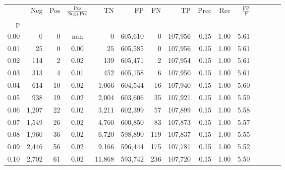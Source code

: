 \begin{tabular}{rrrcrrrrrrrrrrr}
\toprule
{} &     Neg &    Pos & $\frac{\text{Pos}}{\text{Neg}+\text{Pos}}$ &       TN &       FP &       FN &       TP &  Prec &   Rec & $\frac{\text{FP}}{\text{P}}$ \\
p    &         &        &                                            &          &          &          &          &       &       &                              \\
\midrule
0.00 &       0 &      0 &                                        nan &        0 &  605,610 &        0 &  107,956 &  0.15 &  1.00 &                         5.61 \\
0.01 &      25 &      0 &                                       0.00 &       25 &  605,585 &        0 &  107,956 &  0.15 &  1.00 &                         5.61 \\
0.02 &     114 &      2 &                                       0.02 &      139 &  605,471 &        2 &  107,954 &  0.15 &  1.00 &                         5.61 \\
0.03 &     313 &      4 &                                       0.01 &      452 &  605,158 &        6 &  107,950 &  0.15 &  1.00 &                         5.61 \\
0.04 &     614 &     10 &                                       0.02 &    1,066 &  604,544 &       16 &  107,940 &  0.15 &  1.00 &                         5.60 \\
0.05 &     938 &     19 &                                       0.02 &    2,004 &  603,606 &       35 &  107,921 &  0.15 &  1.00 &                         5.59 \\
0.06 &   1,207 &     22 &                                       0.02 &    3,211 &  602,399 &       57 &  107,899 &  0.15 &  1.00 &                         5.58 \\
0.07 &   1,549 &     26 &                                       0.02 &    4,760 &  600,850 &       83 &  107,873 &  0.15 &  1.00 &                         5.57 \\
0.08 &   1,960 &     36 &                                       0.02 &    6,720 &  598,890 &      119 &  107,837 &  0.15 &  1.00 &                         5.55 \\
0.09 &   2,446 &     56 &                                       0.02 &    9,166 &  596,444 &      175 &  107,781 &  0.15 &  1.00 &                         5.52 \\
0.10 &   2,702 &     61 &                                       0.02 &   11,868 &  593,742 &      236 &  107,720 &  0.15 &  1.00 &                         5.50 \\

\end{tabular}
